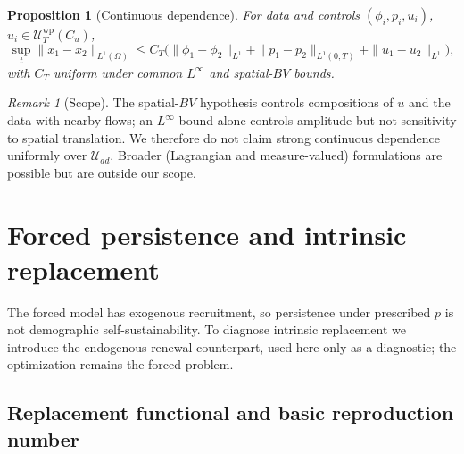 \documentclass[pdflatex,sn-mathphys-num]{sn-jnl}
\newcommand{\Om}{\Omega}
\newcommand{\Uad}{\mathcal{U}_{ad}}
\theoremstyle{plain}
\newtheorem{proposition}[theorem]{Proposition}
\theoremstyle{definition}
\theoremstyle{remark}
\newtheorem{remark}[theorem]{Remark}
\begin{document}
\begin{proposition}[Continuous dependence]
\label{prop:continuous_dependence}
For data and controls $(\phi_i,p_i,u_i)$, $u_i\in\mathcal U_T^{\mathrm{wp}}(C_u)$,
\begin{equation}\label{eq:continuous_dependence}
\sup_{t}\|x_1-x_2\|_{L^1(\Om)}
\le
C_T\big(\|\phi_1-\phi_2\|_{L^1}+\|p_1-p_2\|_{L^1(0,T)}+\|u_1-u_2\|_{L^1}\big),
\end{equation}
with $C_T$ uniform under common $L^\infty$ and spatial-$BV$ bounds.
\end{proposition}

\begin{remark}[Scope]
\label{rmk:wp_scope}
The spatial-$BV$ hypothesis controls compositions of $u$ and the data with nearby
flows; an $L^\infty$ bound alone controls amplitude but not sensitivity to
spatial translation. We therefore do not claim strong continuous dependence
uniformly over $\Uad$. Broader (Lagrangian and measure-valued)
formulations are possible \cite{gwiazda2010structured,yu2026beyond,carrillo2012structured} but are outside our scope.
\end{remark}

\section{Forced persistence and intrinsic replacement}
\label{sec:persistence}

The forced model has exogenous recruitment, so persistence under prescribed $p$
is not demographic self-sustainability. To diagnose intrinsic replacement we
introduce the endogenous renewal counterpart, used here only as a diagnostic; the
optimization remains the forced problem.

\subsection{Replacement functional and basic reproduction number}
\label{subsec:renewal}
\end{document}
